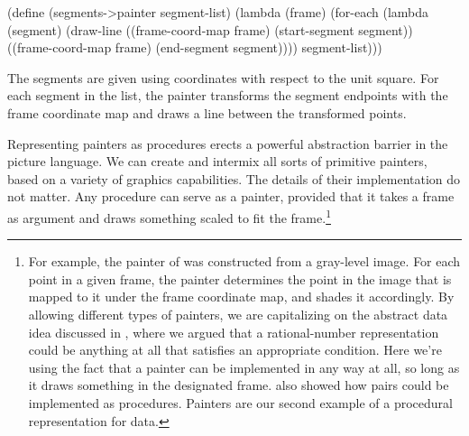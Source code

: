 \begin{codeBlock}
(define (segments->painter segment-list)
  (lambda (frame)
    (for-each
     (lambda (segment)
       (draw-line
        ((frame-coord-map frame)
         (start-segment segment))
        ((frame-coord-map frame)
         (end-segment segment))))
     segment-list)))
\end{codeBlock}

\noindent
The segments are given using coordinates with respect to the unit square.  For
each segment in the list, the painter transforms the segment endpoints with the
frame coordinate map and draws a line between the transformed points.

Representing painters as procedures erects a powerful abstraction barrier in
the picture language.  We can create and intermix all sorts of primitive
painters, based on a variety of graphics capabilities. The details of their
implementation do not matter.  Any procedure can serve as a painter, provided
that it takes a frame as argument and draws something scaled to fit the
frame.\footnote{For example, the  painter of  was
constructed from a gray-level image.  For each point in a given frame, the
 painter determines the point in the image that is mapped to it
under the frame coordinate map, and shades it accordingly.  By allowing
different types of painters, we are capitalizing on the abstract data idea
discussed in , where we argued that a rational-number
representation could be anything at all that satisfies an appropriate
condition.  Here we're using the fact that a painter can be implemented in any
way at all, so long as it draws something in the designated frame.
 also showed how pairs could be implemented as procedures.  Painters
are our second example of a procedural representation for data.}

